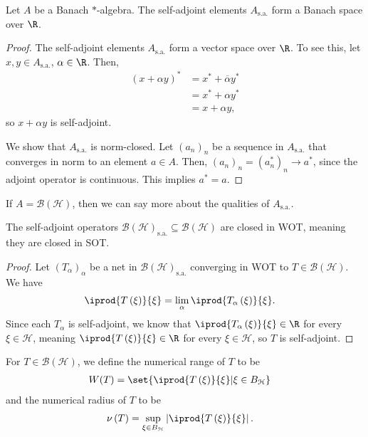 \documentclass[10pt]{mypackage}
\newcommand{\sa}{\text{s.a.}}
\begin{document}
\begin{proposition}
  Let $A$ be a Banach $\ast$-algebra. The self-adjoint elements $A_{\sa}$ form a Banach space over $\R$.
\end{proposition}
\begin{proof}
  The self-adjoint elements $A_{\sa}$ form a vector space over $\R$. To see this, let $x,y\in A_{\sa}$, $\alpha\in \R$. Then,
  \begin{align*}
    \left(x + \alpha y\right)^{\ast} &= x^{\ast} + \overline{\alpha}y^{\ast}\\
                                     &= x^{\ast} + \alpha y^{\ast}\\
                                     &= x + \alpha y,
  \end{align*}
  so $x + \alpha y$ is self-adjoint.\newline

  We show that $A_{\sa}$ is norm-closed. Let $\left(a_n\right)_n$ be a sequence in $A_{\sa}$ that converges in norm to an element $a\in A$. Then, $\left(a_n\right)_n = \left(a_n^{\ast}\right)_n\rightarrow a^{\ast}$, since the adjoint operator is continuous. This implies $a^{\ast} = a$.
\end{proof}
If $A = \mathcal{B}\left(\mathcal{H}\right)$, then we can say more about the qualities of $A_{\sa}$.
\begin{proposition}
  The self-adjoint operators $\mathcal{B}\left(\mathcal{H}\right)_{\sa}\subseteq \mathcal{B}\left(\mathcal{H}\right)$ are closed in WOT, meaning they are closed in SOT.
\end{proposition}
\begin{proof}
  Let $\left(T_{\alpha}\right)_{\alpha}$ be a net in $\mathcal{B}\left(\mathcal{H}\right)_{\sa}$ converging in WOT to $T\in \mathcal{B}\left(\mathcal{H}\right)$. We have
  \begin{align*}
    \iprod{T\left(\xi\right)}{\xi} &= \lim_{\alpha} \iprod{T_{\alpha}\left(\xi\right)}{\xi}.
  \end{align*}
  Since each $T_{\alpha}$ is self-adjoint, we know that $ \iprod{T_{\alpha}\left(\xi\right)}{\xi}\in \R$ for every $\xi\in \mathcal{H}$, meaning $ \iprod{T\left(\xi\right)}{\xi}\in \R $ for every $\xi\in \mathcal{H}$, so $T$ is self-adjoint.
\end{proof}
\begin{definition}
  For $T\in \mathcal{B}\left(\mathcal{H}\right)$, we define the numerical range of $T$ to be
  \begin{align*}
    W(T) &= \set{ \iprod{T\left(\xi\right)}{\xi} | \xi\in B_{\mathcal{H}} }
  \end{align*}
  and the numerical radius of $T$ to be
  \begin{align*}
    \nu\left(T\right) &= \sup_{\xi \in B_{\mathcal{H}}} \left\vert \iprod{T\left(\xi\right)}{\xi} \right\vert.
  \end{align*}
\end{definition}
\end{document}
